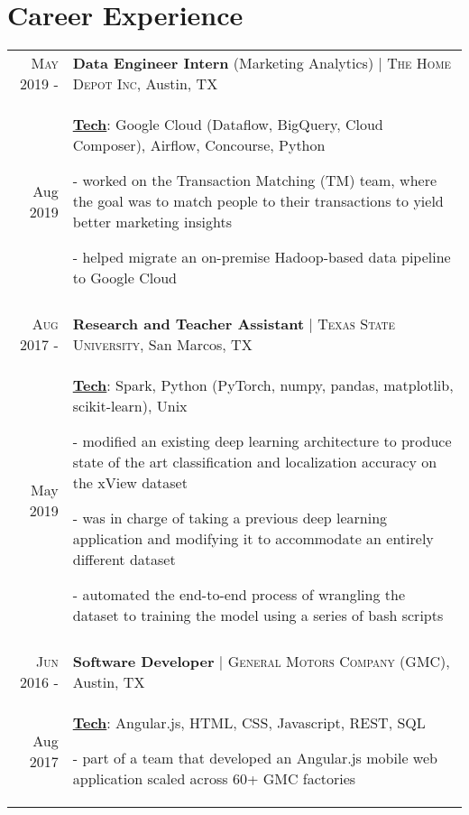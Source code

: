 \documentclass[a4paper,10pt]{article}
\begin{document}
\section{Career Experience}
\begin{tabular}{r|p{12cm}}

\textsc{May 2019 -} & \textbf{Data Engineer Intern} (Marketing Analytics) | \textsc{The Home Depot Inc}, Austin, TX \\
Aug 2019 & \small{
	\textbf{\underline{Tech}}: Google Cloud (Dataflow, BigQuery, Cloud Composer), Airflow, Concourse, Python}

	\tiny{
	\vphantom{a}
	}
	
	\small{
	- worked on the Transaction Matching (TM) team, where the goal was to match people to their transactions to yield better marketing insights
	
	- helped migrate an on-premise Hadoop-based data pipeline to Google Cloud } \\
 \multicolumn{2}{c}{} \\

\textsc{Aug 2017 -} & \textbf{Research and Teacher Assistant} | \textsc{Texas State University}, San Marcos, TX \\
May 2019 & \small{
	\textbf{\underline{Tech}}: Spark, Python (PyTorch, numpy, pandas, matplotlib, scikit-learn), Unix
	}

	\tiny{
	\vphantom{a}
	}

	\small{
	
	- modified an existing deep learning architecture to produce state of the art classification and localization accuracy on the xView dataset
	
	- was in charge of taking a previous deep learning application and modifying it to accommodate an entirely different dataset 
	
	- automated the end-to-end process of wrangling the dataset to training the model using a series of bash scripts
	}
	\\
 \multicolumn{2}{c}{} \\
 
 \textsc{Jun 2016 -} & \textbf{Software Developer} | \textsc{General Motors Company (GMC)}, Austin, TX \\
Aug 2017 & \small{
	\textbf{\underline{Tech}}: Angular.js, HTML, CSS, Javascript, REST, SQL}

	\tiny{
	\vphantom{a}
	}
	
	\small{
	- part of a team that developed an Angular.js mobile web application scaled across 60+ GMC factories 
	
}
\end{tabular}
\end{document}
